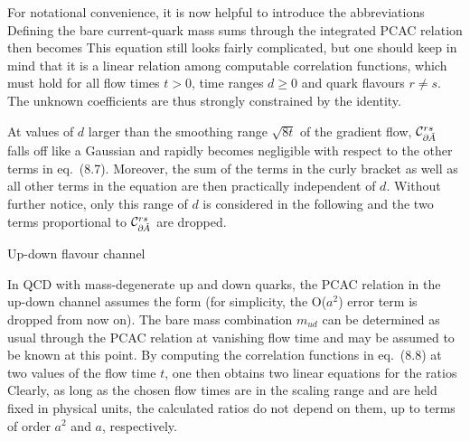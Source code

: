 For notational convenience, it is now helpful 
to introduce the abbreviations
Defining the bare current-quark mass sums through
the integrated PCAC relation then becomes
This equation still looks fairly complicated, but one should keep in mind
that it is a linear relation among computable correlation functions,
which must hold for all flow times $t>0$, time ranges
$d\geq0$ and quark flavours
$r\neq s$. The unknown coefficients are thus strongly
constrained by the identity.

At values of $d$ larger than the smoothing range 
$\sqrt{8t}$ of the gradient flow, ${\cal C}_{\partial\kern-0.5pt\tilde{A}}^{rs}$ falls off like a Gaussian
and rapidly becomes negligible with respect to the other terms in
eq.~(8.7). Moreover, the sum of the terms in the curly bracket 
as well as all other terms in the equation 
are then practically independent of $d$.
Without further notice, only this 
range of $d$ is considered in the following and the
two terms proportional to ${\cal C}_{\partial\kern-0.5pt\tilde{A}}^{rs}$ are dropped.


 Up-down flavour channel

In QCD with mass-degenerate up and down quarks,
the PCAC relation in the up-down channel assumes the form
(for simplicity, the O($a^2$) error term is dropped from now on).
The bare mass combination $m_{ud}$ can be determined as usual
through the PCAC relation at vanishing flow time
and may be assumed to be known at this point.
By computing the correlation functions in eq.~(8.8) at 
two values of the flow time $t$, one then obtains
two linear equations for the ratios
Clearly, as long as the chosen flow times are
in the scaling range and are held fixed in physical units,
the calculated ratios do not depend on them,
up to terms of order $a^2$
and $a$, respectively. 

